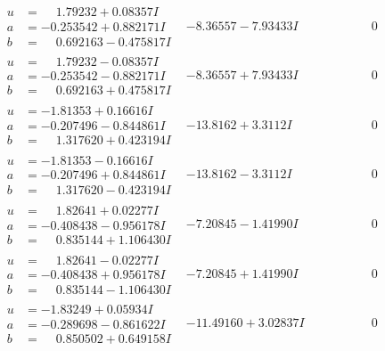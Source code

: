 \documentclass[1p]{elsarticle_modified}
\theoremstyle{definition}
\begin{document}
$$\begin{array}{c|c|c}
\begin{aligned}
u &= \phantom{-}1.79232 + 0.08357 I \\
a &= -0.253542 + 0.882171 I \\
b &= \phantom{-}0.692163 - 0.475817 I\end{aligned}
 & -8.36557 - 7.93433 I & \phantom{-0.000000 } 0 \\ \hline\begin{aligned}
u &= \phantom{-}1.79232 - 0.08357 I \\
a &= -0.253542 - 0.882171 I \\
b &= \phantom{-}0.692163 + 0.475817 I\end{aligned}
 & -8.36557 + 7.93433 I & \phantom{-0.000000 } 0 \\ \hline\begin{aligned}
u &= -1.81353 + 0.16616 I \\
a &= -0.207496 - 0.844861 I \\
b &= \phantom{-}1.317620 + 0.423194 I\end{aligned}
 & -13.8162 + 3.3112 I & \phantom{-0.000000 } 0 \\ \hline\begin{aligned}
u &= -1.81353 - 0.16616 I \\
a &= -0.207496 + 0.844861 I \\
b &= \phantom{-}1.317620 - 0.423194 I\end{aligned}
 & -13.8162 - 3.3112 I & \phantom{-0.000000 } 0 \\ \hline\begin{aligned}
u &= \phantom{-}1.82641 + 0.02277 I \\
a &= -0.408438 - 0.956178 I \\
b &= \phantom{-}0.835144 + 1.106430 I\end{aligned}
 & -7.20845 - 1.41990 I & \phantom{-0.000000 } 0 \\ \hline\begin{aligned}
u &= \phantom{-}1.82641 - 0.02277 I \\
a &= -0.408438 + 0.956178 I \\
b &= \phantom{-}0.835144 - 1.106430 I\end{aligned}
 & -7.20845 + 1.41990 I & \phantom{-0.000000 } 0 \\ \hline\begin{aligned}
u &= -1.83249 + 0.05934 I \\
a &= -0.289698 - 0.861622 I \\
b &= \phantom{-}0.850502 + 0.649158 I\end{aligned}
 & -11.49160 + 3.02837 I & \phantom{-0.000000 } 0 \\ \hline\begin{aligned}

\end{aligned}
\end{array}$$
\end{document}
